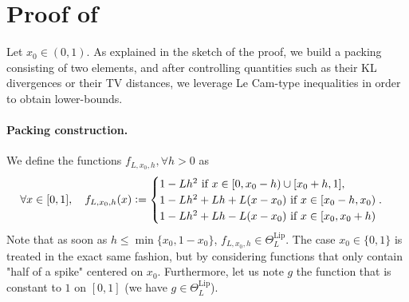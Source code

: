 \documentclass[10pt]{article} %
\newcommand{\eqdef}{\vcentcolon=}
\begin{document}
\section{Proof of }
\label{proofofth:lpdp}

    Let $x_0 \in (0, 1)$. As explained in the sketch of the proof, we build a packing consisting of two elements, and after controlling quantities such as their KL divergences or their TV distances, we leverage Le Cam-type inequalities in order to obtain lower-bounds.
    \paragraph{Packing construction.}
    We define the functions $f_{L, x_0, h}, \forall h>0$ as 
\begin{equation}
\label{eq:deftrianglefunction}
    \forall x \in [0, 1], \quad f_{L, x_0, h}(x) 
    \eqdef
    \begin{cases}
      1-Lh^2 \text{ if } x \in [0, x_0-h) \cup [x_0+h, 1],\\
      1-Lh^2+Lh + L (x-x_0) \text{ if } x \in [x_0-h, x_0) \;. \\
      1-Lh^2+Lh - L (x-x_0) \text{ if } x \in [x_0, x_0+h) \\
    \end{cases}
\end{equation}
Note that as soon as $h \leq \min \{ x_0, 1-x_0 \}$, $f_{L, x_0, h} \in \Theta^{\text{Lip}}_L$. The case $x_0 \in \{0, 1 \}$ is treated in the exact same fashion, but by considering functions that only contain "half of a spike" centered on $x_0$. Furthermore, let us note $g$ the function that is constant to $1$ on $[0, 1]$ (we have $g \in \Theta^{\text{Lip}}_L$). 
\end{document}

